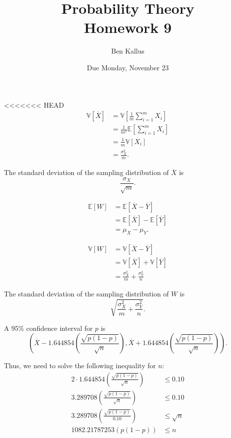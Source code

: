 \documentclass[12pt]{article}
\title{Probability Theory \\ Homework 9}
\author{Ben Kallus}
\date{Due Monday, November 23}
\begin{document}
\pagecolor{black}
\color{white}
\maketitle


\medskip
<<<<<<< HEAD
\begin{align*}
    \mathbb V [\overline X] &= \mathbb V\left[\frac1m \sum_{i=1}^m X_i\right] \\
                            &= \frac1{m^2} \mathbb E\left[ \sum_{i=1}^m X_i \right] \\
                            &= \frac1m \mathbb V[X_i] \\
                            &= \frac{\sigma^2_X}m.
\end{align*}

The standard deviation of the sampling distribution of $\overline X$ is $$\frac{\sigma_X}{\sqrt m}.$$

\medskip
{}
\begin{align*}
    \mathbb E[W] &= \mathbb E[\overline X - \overline Y] \\
                 &= \mathbb E[\overline X] - \mathbb E[\overline Y] \\
                 &= \mu_X - \mu_Y.
\end{align*}

\begin{align*}
    \mathbb V[W] &= \mathbb V[\overline X - \overline Y] \\
                 &= \mathbb V[\overline X] + \mathbb V[\overline Y] \\
                 &= \frac{\sigma^2_X}m + \frac{\sigma^2_Y}n
\end{align*}

The standard deviation of the sampling distribution of $W$ is $$\sqrt{\frac{\sigma^2_X}m + \frac{\sigma^2_Y}n}.$$


\newpage
{}

\medskip
{} A 95\% confidence interval for $p$ is
$$\left(\overline X - 1.644854\left(\frac{\sqrt{p(1-p)}}{\sqrt n}\right), \overline X + 1.644854\left(\frac{\sqrt{p(1-p)}}{\sqrt n}\right) \right).$$

Thus, we need to solve the following inequality for $n$:
\begin{align*}
    2 \cdot 1.644854\left(\frac{\sqrt{p(1-p)}}{\sqrt n}\right) &\leq 0.10 \\
    3.289708\left(\frac{\sqrt{p(1-p)}}{\sqrt n}\right) &\leq 0.10 \\
    3.289708\left(\frac{\sqrt{p(1-p)}}{0.10}\right) &\leq \sqrt n \\
    1082.21787253(p(1-p)) &\leq n
\end{align*}
\end{document}
